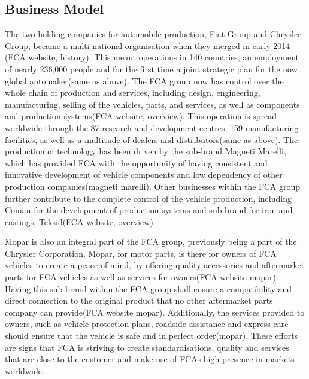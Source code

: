 \subsection{Business Model}
The two holding companies for automobile production, Fiat Group and Chrysler Group, became a multi-national organisation when they merged in early 2014 (FCA website, history). This meant operations in 140 countries, an employment of nearly 236,000 people and for the first time a joint strategic plan for the now global automaker(same as above). The FCA group now has control over the whole chain of production and services, including design, engineering, manufacturing, selling of the vehicles, parts, and services, as well as components and production systems(FCA website, overview). This operation is spread worldwide through the 87 research and development centres, 159 manufacturing facilities, as well as a multitude of dealers and distributors(same as above). The production of technology has been driven by the sub-brand Magneti Marelli, which has provided FCA with the opportunity of having consistent and innovative development of vehicle components and low dependency of other production companies(magneti marelli). Other businesses within the FCA group further contribute to the complete control of the vehicle production, including Comau for the development of production systems and sub-brand for iron and castings, Teksid(FCA website, overview). 

Mopar is also an integral part of the FCA group, previously being a part of the Chrysler Corporation. Mopar, for motor parts, is there for owners of FCA vehicles to create a peace of mind, by offering quality accessories and aftermarket parts for FCA vehicles as well as services for owners(FCA website mopar). Having this sub-brand within the FCA group shall ensure a compatibility and direct connection to the original product that no other aftermarket parts company can provide(FCA website mopar). Additionally, the services provided to owners, such as vehicle protection plans, roadside assistance and express care should ensure that the vehicle is safe and in perfect order(mopar). These efforts are signs that FCA is striving to create standardisations, quality and services that are close to the customer and make use of FCAs high presence in markets worldwide. 
 
